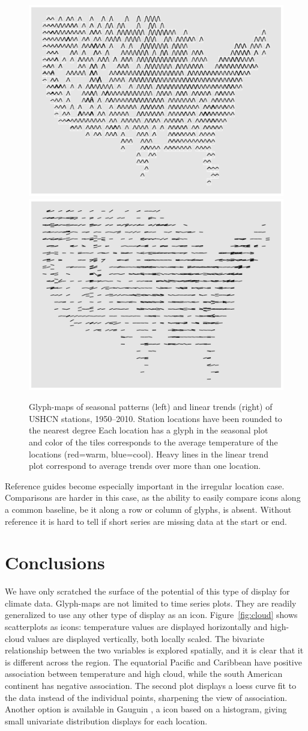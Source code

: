 \documentclass[oneside]{article}
\begin{document}
\begin{figure}[htbp]
  \centering
  \includegraphics[width=0.5\linewidth]{usa-season-grid}%
  \includegraphics[width=0.5\linewidth]{usa-lin-grid}%
  \caption{Glyph-maps of seasonal patterns (left) and linear trends (right) of USHCN stations, 1950--2010.  Station locations have been rounded to the nearest degree Each location has a glyph in the seasonal plot and color of the tiles corresponds to the average temperature of the locations (red=warm, blue=cool).  Heavy lines in the linear trend plot correspond to average trends over more than one location.}
  \label{fig:irregular-grid}
\end{figure}

Reference guides become especially important in the irregular location case. Comparisons are harder in this case, as the ability to easily compare icons along a common baseline, be it along a row or column of glyphs, is absent. Without reference it is hard to tell if short series are missing data at the start or end.  

\section{Conclusions}

We have only scratched the surface of the potential of this type of display for climate data. Glyph-maps are not limited to time series plots. They are readily generalized to use any other type of display as an icon. Figure~\ref{fig:cloud} shows scatterplots as icons: temperature values are displayed horizontally and high-cloud values are displayed vertically, both locally scaled. The bivariate relationship between the two variables is explored spatially, and it is clear that it is different across the region. The equatorial Pacific and Caribbean have positive association between temperature and high cloud, while the south American continent has negative association. The second plot displays a loess curve fit to the data instead of the individual points, sharpening the view of association. Another option is available in Gauguin \citep{gribov:2006}, a icon based on a histogram, giving small univariate distribution displays for each location.
\end{document}

